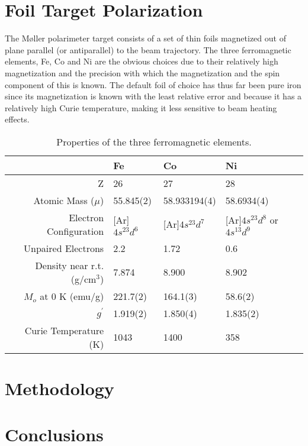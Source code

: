 \documentclass[12pt]{article}
\begin{document}
\section{Foil Target Polarization}
The M\o ller polarimeter target consists of a set of thin foils magnetized out of plane parallel (or antiparallel) to the beam trajectory. The three ferromagnetic elements, Fe, Co and Ni are the obvious choices due to their relatively high magnetization and the precision with which the magnetization and the spin component of this is known. The default foil of choice has thus far been pure iron since its magnetization is known with the least relative error and because it has a relatively high Curie temperature, making it less sensitive to beam heating effects.
\begin{table}[h]
\begin{center}
\begin{tabular}{|r|l|l|l|}\hline
~&Fe&Co&Ni\\\hline
Z&26&27&28\\
Atomic Mass ($\mu$)&55.845(2)&58.933194(4)&58.6934(4)\\
Electron Configuration&[Ar]$4s^23d^6$&[Ar]$4s^23d^7$&[Ar]$4s^23d^8$ or $4s^13d^9$\\
Unpaired Electrons&2.2&1.72&0.6\\
Density near r.t. (g/cm$^3$)&7.874&8.900&8.902\\
$M_o$ at 0 K (emu/g)&221.7(2)&164.1(3)&58.6(2)\\
$g^{\prime}$&1.919(2)&1.850(4)&1.835(2)\\
Curie Temperature (K)& 1043&1400&358\\\hline
\end{tabular}
\end{center}
\caption{Properties of the three ferromagnetic elements.}
\end{table}

\section{Methodology}\label{method}



\section{Conclusions}\label{conclusions}

\FloatBarrier


\end{document}
